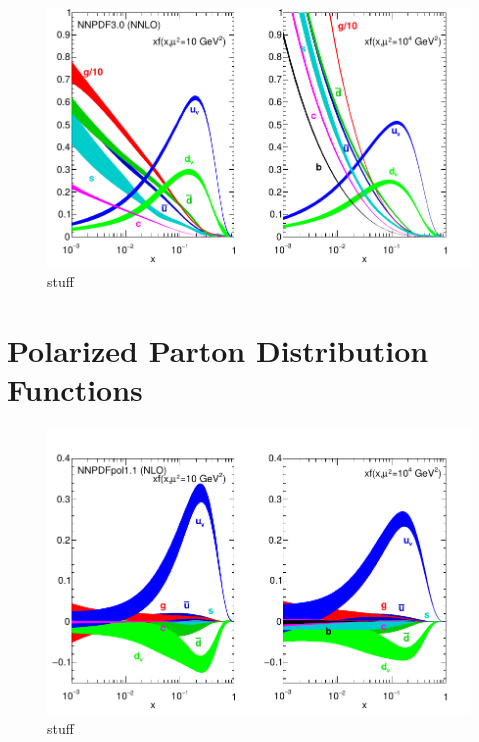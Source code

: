 \begin{figure}[ht]
  \centering
  \includegraphics[width=0.7\linewidth]{./figures/unpolarized_pdfs.pdf}
  \caption{
    stuff~\cite{ReviewEidelman2012}
  } 
  \label{fig:unpolarized_pdf}
\end{figure}

\section{Polarized Parton Distribution Functions}
\label{sec:polarized_pdfs}

\begin{figure}
  \centering
  \includegraphics[width=0.7\linewidth]{./figures/polarized_pdfs.pdf}
  \caption{
    stuff~\cite{ReviewEidelman2012}
  }
  \label{fig:polarized_pdfs}
\end{figure}

